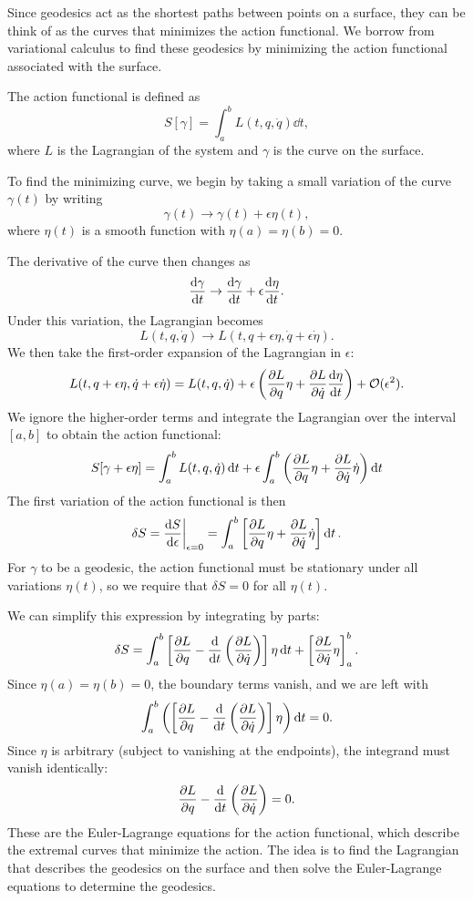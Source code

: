 \documentclass[12pt]{article}
\begin{document}
Since geodesics act as the shortest paths between points on a surface, they can be think of as the curves that minimizes the action functional.
We borrow from variational calculus to find these geodesics by minimizing the action functional associated with the surface.

The action functional is defined as
\[
    S[\gamma] = \int_{a}^{b} L(t, q, \dot{q}) \dd{t},
\]
where \(L\) is the Lagrangian of the system and \(\gamma\) is the curve on the surface.

To find the minimizing curve, we begin by taking a small variation of the curve \(\gamma(t)\) by writing
\[
    \gamma(t) \to \gamma(t) + \epsilon \eta(t),
\]
where \(\eta(t)\) is a smooth function with \(\eta(a) = \eta(b) = 0\).

The derivative of the curve then changes as 
\[
    \dv{\gamma}{t} \to \dv{\gamma}{t} + \epsilon \dv{\eta}{t}.
\]
Under this variation, the Lagrangian becomes
\[
    L(t, q, \dot{q}) \to L(t, q + \epsilon \eta, \dot{q} + \epsilon \dot{\eta}).
\]
We then take the first-order expansion of the Lagrangian in \(\epsilon\):
\[
    L(t, q + \epsilon \eta, \dot{q} + \epsilon \dot{\eta}) = L(t, q, \dot{q}) + \epsilon \left( \pdv{L}{q} \eta + \pdv{L}{\dot{q}} \dv{\eta}{t} \right) + \mathcal{O}(\epsilon^2).    
\]
We ignore the higher-order terms and integrate the Lagrangian over the interval \([a,b]\) to obtain the action functional:
\[
    S[\gamma + \epsilon \eta] = \int_{a}^{b} L(t, q, \dot{q}) \dd{t} + \epsilon \int_{a}^{b} \left( \pdv{L}{q} \eta + \pdv{L}{\dot{q}} \dot{\eta} \right) \dd{t}
\]
The first variation of the action functional is then
\[
    \delta S = \dv{S}{\epsilon} \bigg|_{\epsilon = 0} = \int_{a}^{b} \left[ \pdv{L}{q} \eta + \pdv{L}{\dot{q}} \dot{\eta} \right] \dd{t}.
\]
For $\gamma$ to be a geodesic, the action functional must be stationary under all variations $\eta(t)$, so we require that $\delta S = 0$ for all $\eta(t)$.

We can simplify this expression by integrating by parts:
\[
    \delta S = \int_{a}^{b} \left[ \pdv{L}{q} - \dv{t} \left(\pdv{L}{\dot{q}}\right) \right] \eta \dd{t} + \left[ \pdv{L}{\dot{q}} \eta \right]_{a}^{b}.
\]
Since $\eta(a) = \eta(b) = 0$, the boundary terms vanish, and we are left with
\[
    \int_{a}^{b} \left(\left[ \pdv{L}{q} - \dv{t} \left(\pdv{L}{\dot{q}}\right) \right] \eta \right) \dd{t} = 0.
\]
Since $\eta$ is arbitrary (subject to vanishing at the endpoints), the integrand must vanish identically:
\[
    \pdv{L}{q} - \dv{t} \left(\pdv{L}{\dot{q}}\right) = 0.
\]
These are the Euler-Lagrange equations for the action functional, which describe the extremal curves that minimize the action.
The idea is to find the Lagrangian that describes the geodesics on the surface and then solve the Euler-Lagrange equations to determine the geodesics.
\end{document}
